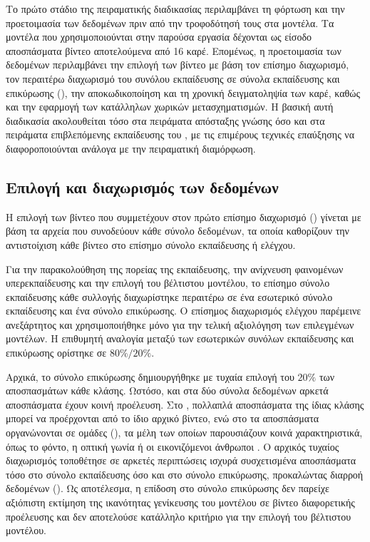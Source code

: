 Το πρώτο στάδιο της πειραματικής διαδικασίας περιλαμβάνει τη φόρτωση και
την προετοιμασία των δεδομένων πριν από την τροφοδότησή τους στα μοντέλα.
Τα μοντέλα  που χρησιμοποιούνται στην παρούσα εργασία
δέχονται ως είσοδο αποσπάσματα βίντεο αποτελούμενα από 16 καρέ. Επομένως,
η προετοιμασία των δεδομένων περιλαμβάνει την επιλογή των βίντεο με βάση
τον επίσημο διαχωρισμό, τον περαιτέρω διαχωρισμό του συνόλου εκπαίδευσης
σε σύνολα εκπαίδευσης και επικύρωσης (),
την αποκωδικοποίηση και τη χρονική δειγματοληψία των καρέ, καθώς και την
εφαρμογή των κατάλληλων χωρικών μετασχηματισμών. Η βασική αυτή διαδικασία
ακολουθείται τόσο στα πειράματα απόσταξης γνώσης όσο και στα πειράματα
επιβλεπόμενης εκπαίδευσης του , με τις
επιμέρους τεχνικές επαύξησης να διαφοροποιούνται ανάλογα με την
πειραματική διαμόρφωση.


\subsection{Επιλογή και διαχωρισμός των δεδομένων}
\label{subsec:data-selection-split}

Η επιλογή των βίντεο που συμμετέχουν στον πρώτο επίσημο διαχωρισμό
() γίνεται με βάση τα αρχεία  που συνοδεύουν κάθε
σύνολο δεδομένων, τα οποία καθορίζουν την αντιστοίχιση κάθε βίντεο στο
επίσημο σύνολο εκπαίδευσης ή ελέγχου.

Για την παρακολούθηση της πορείας της εκπαίδευσης, την ανίχνευση
φαινομένων υπερεκπαίδευσης και την επιλογή του βέλτιστου μοντέλου, το
επίσημο σύνολο εκπαίδευσης κάθε συλλογής διαχωρίστηκε περαιτέρω σε ένα
εσωτερικό σύνολο εκπαίδευσης και ένα σύνολο επικύρωσης. Ο επίσημος
διαχωρισμός ελέγχου παρέμεινε ανεξάρτητος και χρησιμοποιήθηκε μόνο για
την τελική αξιολόγηση των επιλεγμένων μοντέλων. Η επιθυμητή αναλογία
μεταξύ των εσωτερικών συνόλων εκπαίδευσης και επικύρωσης ορίστηκε σε
\(80\%/20\%\).

Αρχικά, το σύνολο επικύρωσης δημιουργήθηκε με τυχαία επιλογή του
\(20\%\) των αποσπασμάτων κάθε κλάσης. Ωστόσο, και στα δύο σύνολα
δεδομένων αρκετά αποσπάσματα έχουν κοινή προέλευση. Στο ,
πολλαπλά αποσπάσματα της ίδιας κλάσης μπορεί να προέρχονται από το ίδιο
αρχικό βίντεο, ενώ στο  τα αποσπάσματα οργανώνονται σε ομάδες
(), τα μέλη των οποίων παρουσιάζουν κοινά χαρακτηριστικά,
όπως το φόντο, η οπτική γωνία ή οι εικονιζόμενοι άνθρωποι
\cite{soomro2012ucf101}. Ο αρχικός τυχαίος διαχωρισμός τοποθέτησε σε
αρκετές περιπτώσεις ισχυρά συσχετισμένα αποσπάσματα τόσο στο σύνολο
εκπαίδευσης όσο και στο σύνολο επικύρωσης, προκαλώντας διαρροή δεδομένων
(). Ως αποτέλεσμα, η επίδοση στο σύνολο επικύρωσης δεν
παρείχε αξιόπιστη εκτίμηση της ικανότητας γενίκευσης του μοντέλου σε
βίντεο διαφορετικής προέλευσης και δεν αποτελούσε κατάλληλο κριτήριο για
την επιλογή του βέλτιστου μοντέλου.

